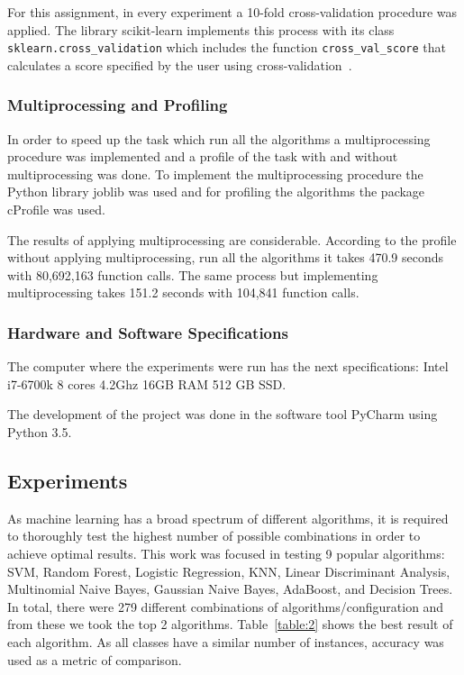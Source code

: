 \documentclass[letterpaper,10pt]{article}
\theoremstyle{mytheor}
\begin{document}
For this assignment, in every experiment a 10-fold cross-validation procedure was applied. The library scikit-learn implements this process with its class \lstinline|sklearn.cross_validation| which includes the function \lstinline|cross_val_score| that calculates a score specified by the user using cross-validation~\cite{scikit-learn}.


\subsubsection{Multiprocessing and Profiling}
In order to speed up the task which run all the algorithms a multiprocessing procedure was implemented and a profile of the task with and without multiprocessing was done. To implement the multiprocessing procedure the Python library joblib was used and for profiling the algorithms the package cProfile was used.

The results of applying multiprocessing are considerable. According to the profile without applying multiprocessing, run all the algorithms it takes 470.9 seconds with 80,692,163 function calls. The same process but implementing multiprocessing takes 151.2 seconds with 104,841 function calls. 

\subsubsection{Hardware and Software Specifications}

The computer where the experiments were run has the next specifications: Intel i7-6700k 8 cores 4.2Ghz 16GB RAM 512 GB SSD.

The development of the project was done in the software tool PyCharm using Python 3.5.

\subsection{Experiments}
As machine learning has a broad spectrum of different algorithms, it is required to thoroughly test  the highest number of possible combinations in order to achieve optimal results. This work was focused in testing 9 popular algorithms: SVM, Random Forest, Logistic Regression, KNN, Linear Discriminant Analysis, Multinomial Naive Bayes, Gaussian Naive Bayes, AdaBoost, and Decision Trees. In total, there were 279 different combinations of algorithms/configuration and from these we took the top 2 algorithms. Table~\ref{table:2} shows the best result of each algorithm. As all classes have a similar number of instances, accuracy was used as a metric of comparison. 
\end{document}
